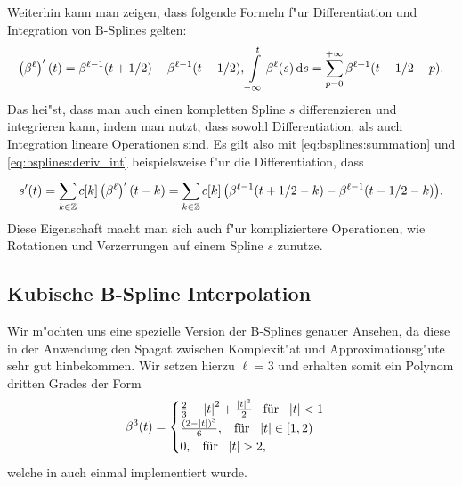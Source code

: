Weiterhin kann man zeigen, dass folgende Formeln f"ur Differentiation und Integration von B-Splines gelten:
\begin{equation}\label{eq:bsplines:deriv_int}
    \left(\beta^\ell\right)^\prime(t) =
        \beta^{\ell-1}(t + 1/2) - \beta^{\ell-1}(t - 1/2), 
    {\int\limits_{-\infty}^{t}{\beta^\ell(s)}\,\mathrm{d}{s}} = 
        {\sum\limits_{p = 0}^{+\infty}{\beta^{\ell+1}(t - 1/2 - p)}}.
\end{equation}
Das hei"st, dass man auch einen kompletten Spline $s$ differenzieren und integrieren kann, indem man nutzt, dass sowohl Differentiation, als auch Integration lineare Operationen sind. 
Es gilt also mit \eqref{eq:bsplines:summation} und \eqref{eq:bsplines:deriv_int} beispielsweise f"ur die Differentiation, dass
\begin{equation}
    s^\prime(t) = {\sum\limits_{k \in \mathbb{Z}}^{}{
        c[k] \left(\beta^{\ell}\right)^\prime(t - k)
    }}
    = {\sum\limits_{k \in \mathbb{Z}}^{}{
        c[k]\left(
            \beta^{\ell-1}(t + 1/2 - k) - \beta^{\ell-1}(t - 1/2 - k)
        \right)
    }}.
\end{equation}
%
Diese Eigenschaft macht man sich auch f"ur kompliziertere Operationen, wie Rotationen und Verzerrungen auf einem Spline $s$ zunutze.
%
%
\subsection{Kubische B-Spline Interpolation}
%
%
Wir m"ochten uns eine spezielle Version der B-Splines genauer Ansehen, da diese in der Anwendung den Spagat zwischen Komplexit"at und Approximationsg"ute sehr gut hinbekommen. 
Wir setzen hierzu $\ell=3$ und erhalten somit ein Polynom dritten Grades der Form
\begin{equation}\label{eq:bsplines:explicit_eval}
    \beta^3(t) = \begin{cases}
        \frac 23 - {\left| t \right|}^2 + \frac{{\left| t \right|}^3}{2} {\hspace{3mm} \text{f\"ur} \hspace{3mm}} {\left| t \right|} < 1\\
        \frac{(2 - {\left| t \right|})^3}{6}, {\hspace{3mm} \text{f\"ur} \hspace{3mm}} {\left| t \right|} \in [1, 2) \\
        0, {\hspace{3mm} \text{f\"ur} \hspace{3mm}} {\left| t \right|} > 2,
    \end{cases}
\end{equation}
welche in  auch einmal implementiert wurde. 

\begin{listing}
\inputminted[firstline=4]{python}{code/bsplines_eval.py}
\label{py:bsplines:eval}            
\end{listing}

